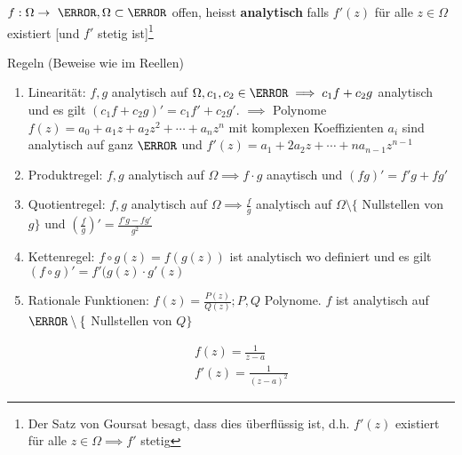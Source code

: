 \begin{def*}[note = Analytische Funktion , index = analytische Funktion , indexformat = {2!~1}]
	$f: \Omega \rightarrow \C , \Omega \subset \C$ offen, heisst \textbf{analytisch} falls $f'(z)$ für alle $z \in \Omega$ existiert [und $f'$ stetig ist]\footnote{Der Satz von Goursat besagt, dass dies überflüssig ist, d.h. $f'(z)$ existiert für alle $z \in \Omega \implies f'$ stetig}
\
\end{def*}
Regeln (Beweise wie im Reellen) \\
\begin{enumerate}
	\item Linearität: $f,g$ analytisch auf $\Omega , c_1 , c_2 \in \C \implies c_1 f + c_2 g$ analytisch und es gilt $(c_1 f + c_2 g)' = c_1 f' + c_2 g'$. $\implies$ Polynome $f(z) = a_0 + a_1 z + a_2 z^2 + \dotsb + a_n z^n$ mit komplexen Koeffizienten $a_i$ sind analytisch auf ganz $\C$ und $f'(z) = a_1 + 2a_2 z + \dotsb + n a_{n-1} z^{n-1}$
	\item Produktregel: $f,g$ analytisch auf $\Omega \implies f \cdot g$ anaytisch und $(fg)' = f'g + fg'$
	\item Quotientregel: $f,g$ analytisch auf $\Omega \implies \frac{f}{g}$ analytisch auf $\Omega \setminus \{$ Nullstellen von $g \}$ und $\left( \frac{f}{g} \right)' = \frac{f'g - fg'}{g^2}$
	\item Kettenregel: $f \circ g (z) = f(g(z))$ ist analytisch wo definiert und es gilt $(f \circ g)' = f'(g(z) \cdot g'(z)$
	\item Rationale Funktionen: $f(z) = \frac{P(z)}{Q(z)} ; P , Q$ Polynome. $f$ ist analytisch auf $\C \setminus \{$ Nullstellen von $Q \}$ \\
		\begin{bsp*}
			\begin{gather*}
				f(z) = \frac{1}{z-a} \\
				f'(z) = \frac{1}{(z-a)^2}
			\end{gather*}
		\end{bsp*}
\end{enumerate}

